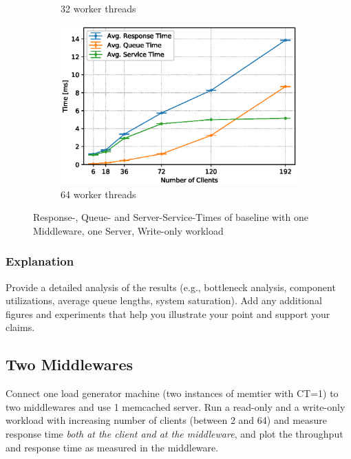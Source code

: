 \documentclass[11pt,a4paper]{article}
\begin{document}
\begin{figure}
\begin{subfigure}{.5\textwidth}
        \caption{32 worker threads}
    \end{subfigure}
    \begin{subfigure}{.5\textwidth}
        \includegraphics[width=1\linewidth]{plots/3_1b_extendedLatencyMiddleware_64w.eps}
        \caption{64 worker threads}
    \end{subfigure}

    \caption{Response-, Queue- and Server-Service-Times of baseline with one Middleware, one Server, Write-only workload}
    \label{fig:3-1-times-writeonly}
\end{figure}

\subsubsection{Explanation}

Provide a detailed analysis of the results (e.g., bottleneck analysis, component utilizations, average queue lengths, system saturation). Add any additional figures and experiments that help you illustrate your point and support your claims.

\subsection{Two Middlewares}

Connect one load generator machine (two instances of memtier with CT=1) to two middlewares and use 1 memcached server. Run a read-only and a write-only workload with increasing number of clients (between 2 and 64) and measure response time \emph{both at the client and at the middleware}, and plot the throughput and response time as measured in the middleware.
\end{document}

